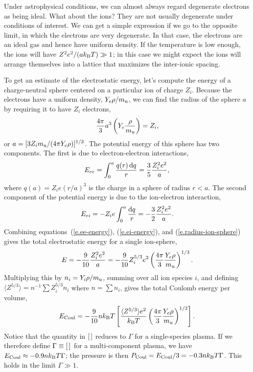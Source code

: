 Under astrophysical conditions, we can almost always regard degenerate electrons as being ideal.  What about the ions?  They are not usually degenerate under conditions of interest. We can get a simple expression if we go to the opposite limit, in which the electrons are very degenerate.  In that case, the electrons are an ideal gas and hence have uniform density. If the temperature is low enough, the ions will have $Z^{2}e^{2}/(ak_\mathrm{B} T) \gg 1$; in this case we might expect the ions will arrange themselves into a lattice that maximizes the inter-ionic spacing.

To get an estimate of the electrostatic energy, let's compute the energy of a charge-neutral sphere centered on a particular ion of charge $Z_{i}$.  Because the electrons have a uniform density, $Y_{e}\rho/m_\mathrm{u}$, we can find the radius of the sphere $a$ by requiring it to have $Z_{i}$ electrons,
\begin{equation}\label{e.radius-ion-sphere}
\frac{4\pi}{3}a^{3}\left(Y_{e}\frac{\rho}{m_\mathrm{u}}\right) = Z_{i},
\end{equation}
or $a = [3 Z_{i} m_\mathrm{u}/(4\pi Y_{e}\rho)]^{1/3}$.  The potential energy of this sphere has two components. The first is due to electron-electron interactions,
\begin{equation}\label{e.ee-energy}
E_{ee} = \int_{0}^{a} \frac{q(r)\, \mathrm{d} q}{r} = \frac{3}{5}\frac{Z_{i}^{2}e^{2}}{a},
\end{equation}
where $q(a) = Z_{i}e(r/a)^{3}$ is the charge in a sphere of radius $r < a$. The second component of the potential energy is due to the ion-electron interaction,
\begin{equation}\label{e.ei-energy}
E_{ei} = -Z_{i}e\int_{0}^{a}\frac{\mathrm{d} q}{r} = -\frac{3}{2}\frac{Z_{i}^{2}e^{2}}{a}.
\end{equation}
Combining equations~(\ref{e.ee-energy}), (\ref{e.ei-energy}), and (\ref{e.radius-ion-sphere}) gives the total electrostatic energy for a single ion-sphere,
\begin{equation}\label{e.madelung-sphere}
E = -\frac{9}{10} \frac{Z_{i}^{2}e^{2}}{a} = -\frac{9}{10} Z_{i}^{5/3} e^{2} \left(\frac{4\pi}{3}\frac{Y_{e}\rho}{m_\mathrm{u}}\right)^{1/3}.
\end{equation}
Multiplying this by $n_{i} = Y_{i}\rho/m_\mathrm{u}$, summing over all ion species $i$, and defining $\langle Z^{5/3}\rangle = n^{-1}\sum Z_{i}^{5/3}n_{i}$ where $n = \sum n_{i}$, gives the total Coulomb energy per volume,
\begin{equation}\label{e.madelung-total}
E_{\mathrm{Coul}} = -\frac{9}{10} nk_\mathrm{B} T \left[\frac{\langle Z^{5/3}\rangle e^{2}}{k_\mathrm{B} T}\left(\frac{4\pi}{3}\frac{Y_{e} \rho}{m_\mathrm{u}}\right)^{1/3}\right].
\end{equation}
Notice that the quantity in $[\,]$ reduces to $\Gamma$ for a single-species plasma.  If we therefore define $\Gamma \equiv [\,]$ for a multi-component plasma, we have $E_{\mathrm{Coul}} \approx -0.9 nk_\mathrm{B} T \Gamma$; the pressure is then $P_{\mathrm{Coul}} = E_{\mathrm{Coul}}/3  = -0.3 n k_\mathrm{B} T \Gamma$. This holds in the limit $\Gamma \gg 1$.

